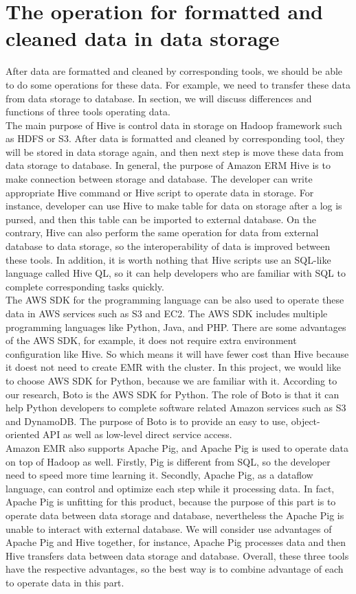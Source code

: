 \section{The operation for formatted and cleaned data in data storage}
After data are formatted and cleaned by corresponding tools, we should be able to do some operations for these data. For example, we need to transfer these data from data storage to database. In section, we will discuss differences and functions of three tools operating data.\\

\noindent The main purpose of Hive is control data in storage on Hadoop framework such as HDFS or S3. After data is formatted and cleaned by corresponding tool, they will be stored in data storage again, and then next step is move these data from data storage to database. In general, the purpose of Amazon ERM Hive is to make connection between storage and database. The developer can write appropriate Hive command or Hive script to operate data in storage. For instance, developer can use Hive to make table for data on storage after a log is pursed, and then this table can be imported to external database. On the contrary, Hive can also perform the same operation for data from external database to data storage, so the interoperability of data is improved between these tools. In addition, it is worth nothing that Hive scripts use an SQL-like language called Hive QL\cite{Z7}, so it can help developers who are familiar with SQL to complete corresponding tasks quickly.\\

\noindent The AWS SDK for the programming language can be also used to operate these data in AWS services such as S3 and EC2. The AWS SDK includes multiple programming languages like Python, Java,  and PHP.  There are some advantages of the AWS SDK, for example, it does not require extra environment configuration like Hive. So which means it will have fewer cost than Hive because it doest not need to create EMR with the cluster.  In this project, we would like to choose AWS SDK for Python, because we are familiar with it. According to our research, Boto is the AWS SDK for Python. The role of Boto is that it can help Python developers to complete software related Amazon services such as S3 and DynamoDB. The purpose of Boto is to provide an easy to use, object-oriented API as well as low-level direct service access.\\

\noindent Amazon EMR also supports Apache Pig, and Apache Pig is used to operate data on top of Hadoop as well. Firstly, Pig is different from SQL, so the developer need to speed more time learning it. Secondly, Apache Pig, as a dataflow language, can control and optimize each step while it processing data. In fact, Apache Pig is unfitting for this product, because the purpose of this part is to operate data between data storage and database, nevertheless the Apache Pig is unable to interact with external database. We will consider use advantages of Apache Pig and Hive together, for instance, Apache Pig processes data and then Hive transfers data between data storage and database. Overall, these three tools have the respective advantages, so the best way is to combine advantage of each to operate data in this part.
